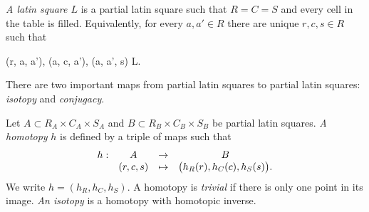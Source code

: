 \begin{defn}
\emph{A latin square $L$} is a partial latin square such that $R=C=S$ and every cell in the table is filled. Equivalently, for every $a, a' \in R$ there are unique $r,c,s \in R$ such that
\begin{cosyeqnarray}
	(r, a, a'), (a, c, a'), (a, a', s) \in L.
\end{cosyeqnarray}
\end{defn}

There are two important maps from partial latin squares to partial latin squares: \emph{isotopy} and \emph{conjugacy}.

\begin{defn}
\label{defn:homotopy}
Let $A \subset R_A \times C_A \times S_A$ and $B \subset R_B \times C_B \times S_B$ be partial latin squares. \emph{A homotopy} $h$ is defined by a triple of maps
%
such that 
$$\begin{array}{ c c c c }
h: &	A & \rightarrow & B \\
	&	(r,c,s) & \mapsto & \big(h_R(r), h_C(c), h_S(s)\big).
\end{array}$$
We write $h = (h_R, h_C, h_S)$. A homotopy is \emph{trivial} if there is only one point in its image. \emph{An isotopy} is a homotopy with homotopic inverse.
\end{defn}

